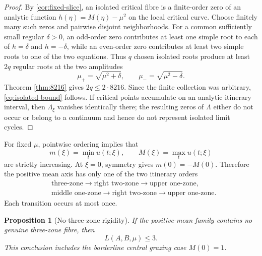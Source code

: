 \documentclass[11pt]{article}
\newtheorem{proposition}[theorem]{Proposition}
\begin{document}
\begin{proof}
By \cref{cor:fixed-slice}, an isolated critical fibre is a finite-order zero of an analytic function $h(\eta)=M(\eta)-\mu^2$ on the local critical curve.  Choose finitely many such zeros and pairwise disjoint neighborhoods.  For a common sufficiently small regular $\delta>0$, an odd-order zero contributes at least one simple root to each of $h=\delta$ and $h=-\delta$, while an even-order zero contributes at least two simple roots to one of the two equations.  Thus $q$ chosen isolated roots produce at least $2q$ regular roots at the two amplitudes
\[
 \mu_+=\sqrt{\mu^2+\delta},
 \qquad
 \mu_-=\sqrt{\mu^2-\delta}.
\]
Theorem \ref{thm:8216} gives $2q\le2\cdot8216$.  Since the finite collection was arbitrary, \eqref{eq:isolated-bound} follows.  If critical points accumulate on an analytic itinerary interval, then $\Lambda_\xi$ vanishes identically there; the resulting zeros of $\Lambda$ either do not occur or belong to a continuum and hence do not represent isolated limit cycles.
\end{proof}

For fixed $\mu$, pointwise ordering implies that
\[
 m(\xi)=\min_t u(t;\xi),
 \qquad
 M(\xi)=\max_t u(t;\xi)
\]
are strictly increasing.  At $\xi=0$, symmetry gives $m(0)=-M(0)$.  Therefore the positive mean axis has only one of the two itinerary orders
\begin{align*}
 &\text{three-zone}\longrightarrow\text{right two-zone}
   \longrightarrow\text{upper one-zone},\\
 &\text{middle one-zone}\longrightarrow\text{right two-zone}
   \longrightarrow\text{upper one-zone}.
\end{align*}
Each transition occurs at most once.

\begin{proposition}[No-three-zone rigidity]\label{prop:no-three-zone}
If the positive-mean family contains no genuine three-zone fibre, then
\begin{equation}\label{eq:no-three-zone-bound}
 \boxed{L(A,B,\mu)\le3}.
\end{equation}
This conclusion includes the borderline central grazing case \(M(0)=1\).
\end{proposition}
\end{document}

